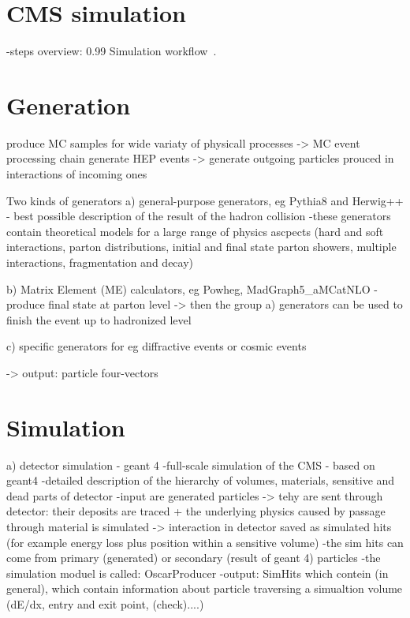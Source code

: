 
\clearpage

\setcounter{secnumdepth}{4}
\setcounter{secnumdepth}{5}


\section{CMS simulation}

-steps overview:
                 {0.99}       %
                 { Simulation workflow~\cite{website:simuBasics}. }

\section{Generation}
produce MC samples for wide variaty of physicall processes -> MC event processing chain
generate HEP events -> generate outgoing particles prouced in interactions of incoming ones

Two kinds of generators
a) general-purpose generators, eg Pythia8 and Herwig++
- best possible description of the result of the hadron collision
-these generators contain theoretical models for a large range of physics ascpects (hard and soft interactions, parton distributions, initial and final state parton showers, multiple interactions, fragmentation and decay)

b) Matrix Element (ME) calculators, eg Powheg, MadGraph5_aMCatNLO
-produce final state at parton level -> then the group a) generators can be used to finish the event up to hadronized level

c) specific generators for eg diffractive events or cosmic events

-> output: particle four-vectors

\section{Simulation}
a) detector simulation - geant 4
-full-scale  simulation of the CMS - based on geant4
-detailed description of the hierarchy of volumes, materials, sensitive and dead parts of detector
-input are generated particles -> tehy are sent through detector: their deposits are traced + the underlying physics caused by passage through material is simulated -> interaction in detector saved as simulated hits (for example energy loss plus position within a sensitive volume)
-the sim hits can come from primary (generated) or secondary (result of geant 4) particles
-the simulation moduel is called: OscarProducer
-output: SimHits which contein (in general), which contain information about particle traversing a simualtion volume (dE/dx, entry and exit point, (check)....)

